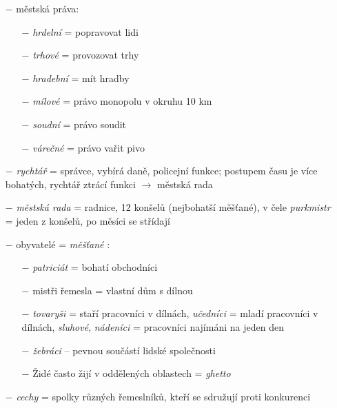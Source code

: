 \documentclass{article}
\begin{document}
\begin{itemize}
\begin{enumerate}
    \end{enumerate}
    \item[$-$] městská práva:
    \begin{multicols}{2}
        \begin{itemize}
            \vspace{-0.5em}
            \setlength\itemsep{0.15em}
            \item[$-$] \textit{hrdelní} = popravovat lidi
            \item[$-$] \textit{trhové} = provozovat trhy
            \item[$-$] \textit{hradební} = mít hradby
            \item[$-$] \textit{mílové} = právo monopolu v okruhu 10 km
            \item[$-$] \textit{soudní} = právo soudit
            \item[$-$] \textit{várečné} = právo vařit pivo
        \end{itemize}
    \end{multicols}
    \item[$-$] \textit{rychtář} = správce, vybírá daně, policejní funkce; postupem času je více bohatých, rychtář ztrácí funkci $\rightarrow$ městská rada
    \item[$-$] \textit{městská rada} = radnice, 12 konšelů (nejbohatší měšťané), v čele \textit{purkmistr} = jeden z konšelů, po měsíci se střídají
    \item[$-$] obyvatelé = \textit{měšťané} :
    \begin{itemize}
        \vspace{-0.5em}
        \setlength\itemsep{0.15em}
        \item[$-$] \textit{patriciát} = bohatí obchodníci
        \item[$-$] mistři řemesla = vlastní dům s dílnou
        \item[$-$] \textit{tovaryši} = staří pracovníci v dílnách, \textit{učedníci} = mladí pracovníci v dílnách, \textit{sluhové}, \textit{nádeníci} = pracovníci najímáni na jeden den
        \item[$-$] \textit{žebráci} -- pevnou součástí lidské společnosti
        \item[$-$] Židé často žijí v oddělených oblastech = \textit{ghetto}
    \end{itemize}
    \item[$-$] \textit{cechy} = spolky různých řemeslníků, kteří se sdružují proti konkurenci
    \begin{itemize}

\end{itemize}
\end{itemize}
\end{document}
